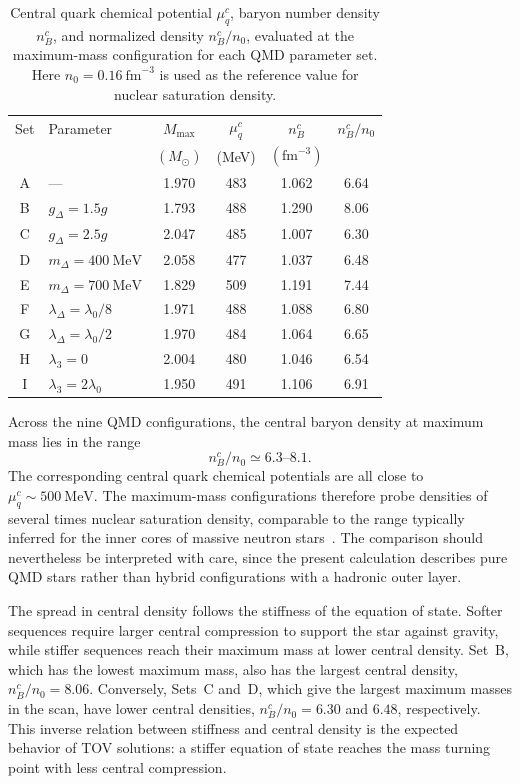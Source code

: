 \begin{table}[H]
\centering
\small
\begin{tabular}{c l c c c c}
\hline
Set & Parameter & \(M_{\max}\) & \(\mu_q^c\) &
    \(n_B^c\) & \(n_B^c/n_0\) \\
& & \((M_\odot)\) & (MeV) & \((\mathrm{fm}^{-3})\) & \\
\hline
A & ---              & 1.970 & 483 & 1.062 & 6.64 \\
\hline
B & \(g_\Delta = 1.5g\)    & 1.793 & 488 & 1.290 & 8.06 \\
C & \(g_\Delta = 2.5g\)    & 2.047 & 485 & 1.007 & 6.30 \\
\hline
D & \(m_\Delta = 400~\mathrm{MeV}\) & 2.058 & 477 & 1.037 & 6.48 \\
E & \(m_\Delta = 700~\mathrm{MeV}\) & 1.829 & 509 & 1.191 & 7.44 \\
\hline
F & \(\lambda_\Delta = \lambda_0/8\) & 1.971 & 488 & 1.088 & 6.80 \\
G & \(\lambda_\Delta = \lambda_0/2\) & 1.970 & 484 & 1.064 & 6.65 \\
\hline
H & \(\lambda_3 = 0\)     & 2.004 & 480 & 1.046 & 6.54 \\
I & \(\lambda_3 = 2\lambda_0\) & 1.950 & 491 & 1.106 & 6.91 \\
\hline
\end{tabular}
\caption{Central quark chemical potential \(\mu_q^c\), baryon number
density \(n_B^c\), and normalized density \(n_B^c/n_0\), evaluated at the
maximum-mass configuration for each QMD parameter set. Here
\(n_0=0.16~\mathrm{fm}^{-3}\) is used as the reference value for nuclear
saturation density.}
\label{tab:qmd_central_state}
\end{table}

Across the nine QMD configurations, the central baryon density at
maximum mass lies in the range
\[
n_B^c/n_0 \simeq 6.3\text{--}8.1 .
\]
The corresponding central quark chemical potentials are all close to
\(\mu_q^c\sim 500~\mathrm{MeV}\). The maximum-mass configurations
therefore probe densities of several times nuclear saturation density,
comparable to the range typically inferred for the inner cores of
massive neutron stars~\cite{Annala2023,Andersen2026}. The comparison
should nevertheless be interpreted with care, since the present
calculation describes pure QMD stars rather than hybrid configurations
with a hadronic outer layer.

The spread in central density follows the stiffness of the equation of
state. Softer sequences require larger central compression to support
the star against gravity, while stiffer sequences reach their maximum
mass at lower central density. Set~B, which has the lowest maximum mass,
also has the largest central density,
\(n_B^c/n_0=8.06\). Conversely, Sets~C and~D, which give the largest
maximum masses in the scan, have lower central densities,
\(n_B^c/n_0=6.30\) and \(6.48\), respectively. This inverse relation
between stiffness and central density is the expected behavior of TOV
solutions: a stiffer equation of state reaches the mass turning point
with less central compression.

